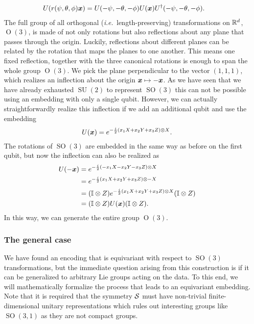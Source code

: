 \documentclass[a4paper,twocolumn,notitlepage,nofootinbib,superscriptaddress,floatfix]{revtex4-2}
\newcommand{\ie}{\textit{i.e.}\ }
\DeclareMathOperator{\SO}{\ensuremath{SO}}
\renewcommand{\O}{\ensuremath{\operatorname{O}}}
\DeclareMathOperator{\SU}{\ensuremath{SU}}
\begin{document}
\begin{align}
    U(r(\psi, \theta, \phi) \boldsymbol{x}) &= U(-\psi,-\theta,-\phi) U(\boldsymbol{x}) U^{\dagger}(-\psi,-\theta,-\phi).
\end{align}
The full group of all orthogonal (\ie length-preserving) transformations on $\mathbb{R}^d$, $\O(3)$, is made of not only rotations but also reflections about any plane that passes through the origin.
Luckily, reflections about different planes can be related by the rotation that maps the planes to one another.
This means one fixed reflection, together with the three canonical rotations is enough to span the whole group $\O(3)$.
We pick the plane perpendicular to the vector $(1,1,1)$, which realizes an inflection about the origin $\boldsymbol{x} \mapsto -\boldsymbol{x}$. As we have seen that we have already exhausted $\SU(2)$ to represent $\SO(3)$ this can not be possible using an embedding with only a single qubit. However, we can actually straightforwardly realize this inflection if we add an additional qubit and use the embedding
\begin{align}
    U(\boldsymbol{x}) = e^{-\frac{i}{2}( x_1 X + x_2 Y + x_3 Z) \otimes X}.
\end{align}
The rotations of $\SO(3)$ are embedded in the same way as before on the first qubit, but now the inflection can also be realized as
\begin{align}
    U(-\boldsymbol{x}) &= e^{-\frac{i}{2}( -x_1 X - x_2 Y  - x_3 Z) \otimes X} \\
    &= e^{-\frac{i}{2}( x_1 X  +x_2 Y  +x_3 Z) \otimes -X} \\
    &= (\mathbb{I} \otimes Z) e^{-\frac{i}{2}( x_1 X  +x_2 Y  +x_3 Z) \otimes X} (\mathbb{I} \otimes Z) \\
    &= (\mathbb{I} \otimes Z) U(\boldsymbol{x}) (\mathbb{I} \otimes Z).
\end{align}
In this way, we can generate the entire group $\O(3)$.

\subsubsection*{The general case}

We have found an encoding that is equivariant with respect to $\SO(3)$ transformations, but the immediate question arising from this construction is if it can be generalized to arbitrary Lie groups acting on the data. To this end, we will mathematically formalize the process that leads to an equivariant embedding.   
Note that it is required that the symmetry $\mathcal{S}$ must have non-trivial finite-dimensional unitary representations which rules out interesting groups like $\SO(3,1)$ as they are not compact groups.
\end{document}
